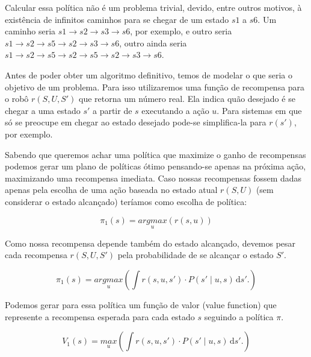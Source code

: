 Calcular essa política não é um problema trivial, devido, entre outros motivos, à existência de infinitos caminhos para se chegar de um estado $ s1 $ a $ s6 $. Um caminho seria $ s1 \rightarrow s2 \rightarrow s3 \rightarrow s6 $, por exemplo, e outro seria $ s1 \rightarrow s2 \rightarrow s5 \rightarrow s2 \rightarrow s3 \rightarrow s6 $, outro ainda seria $ s1 \rightarrow s2 \rightarrow s5 \rightarrow s2 \rightarrow s5 \rightarrow s2 \rightarrow s3 \rightarrow s6 $.

Antes de poder obter um algoritmo definitivo, temos de modelar o que seria o objetivo de um problema. Para isso utilizaremos uma função de recompensa para o robô $ r \left( S, U, S' \right) $ que retorna um número real. Ela indica quão desejado é se chegar a uma estado $ s' $ a partir de $ s $ executando a ação $ u $. Para sistemas em que só se preocupe em chegar ao estado desejado pode-se simplifica-la para $ r \left( s' \right) $, por exemplo.

Sabendo que queremos achar uma política que maximize o ganho de recompensas podemos gerar um plano de políticas ótimo pensando-se apenas na próxima ação, maximizando uma recompensa imediata. Caso nossas recompensas fossem dadas apenas pela escolha de uma ação baseada no estado atual $ r \left( S, U \right) $ (sem considerar o estado alcançado) teríamos como escolha de política:

\begin{equation}
    \pi_1 \left( s \right) = \underset{u}{argmax} \left( r \left( s, u \right) \right)
\end{equation}

Como nossa recompensa depende também do estado alcançado, devemos pesar cada recompensa $ r \left( S, U, S' \right) $ pela probabilidade de se alcançar o estado $ S' $.

\begin{equation}
    \pi_1 \left( s \right) = \underset{u}{argmax} \left( \int \! r \left( s, u, s' \right) \cdot P \left( s' \mid u, s \right) \, \mathrm{d}s'. \right)
\end{equation}

Podemos gerar para essa política um função de valor (value function) que represente a recompensa esperada para cada estado $ s $ seguindo a política $ \pi $.

\begin{equation}
    V_1 \left( s \right) = \underset{u}{max} \left( \int \! r \left( s, u, s' \right) \cdot P \left( s' \mid u, s \right) \, \mathrm{d}s'. \right)
\end{equation}

